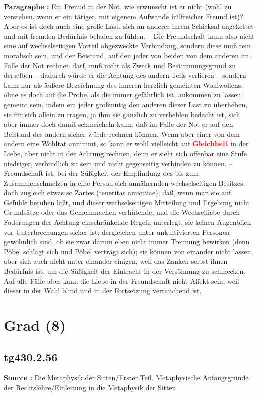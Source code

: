 \documentclass[a4paper,12pt,twoside]{book}
\newcommand{\match}[1]{\textcolor{red}{\textbf{#1}}}
\newcommand{\unnumberedsection}[1]{
	\section*{#1}
	\addcontentsline{toc}{section}{#1}
	\markright{#1}
}
\begin{document}
	\textbf{Paragraphe : }Ein Freund in der Not, wie erwünscht ist er nicht (wohl zu verstehen, wenn er ein tätiger, mit eigenem Aufwande hülfreicher Freund ist)? Aber es ist doch auch eine große Last, sich an anderer ihrem Schicksal angekettet und mit fremden Bedürfnis beladen zu fühlen. – Die Freundschaft kann also nicht eine auf wechselseitigen Vorteil abgezweckte Verbindung, sondern diese muß rein moralisch sein, und der Beistand, auf den jeder von beiden von dem anderen im Falle der Not rechnen darf, muß nicht als Zweck und Bestimmungsgrund zu derselben – dadurch würde er die Achtung des andern Teils verlieren – sondern kann nur als äußere Bezeichnung des inneren herzlich gemeinten Wohlwollens, ohne es doch auf die Probe, als die immer gefährlich ist, ankommen zu lassen, gemeint sein, indem ein jeder großmütig den anderen dieser Last zu überheben, sie für sich allein zu tragen, ja ihm sie gänzlich zu verhehlen bedacht ist, sich aber immer doch damit schmeicheln kann, daß im Falle der Not er auf den Beistand des andern sicher würde rechnen können. Wenn aber einer von dem andern eine Wohltat annimmt, so kann er wohl vielleicht auf \match{Gleichheit} in der Liebe, aber nicht in der Achtung rechnen, denn er sieht sich offenbar eine Stufe niedriger, verbindlich zu sein und nicht gegenseitig verbinden zu können. – Freundschaft ist, bei der Süßigkeit der Empfindung des bis zum Zusammenschmelzen in eine Person sich annähernden wechselseitigen Besitzes, doch zugleich etwas so Zartes (teneritas amicitiae), daß, wenn man sie auf Gefühle beruhen läßt, und dieser wechselseitigen Mitteilung und Ergebung nicht Grundsätze oder das Gemeinmachen verhütende, und die Wechselliebe durch Foderungen der Achtung einschränkende  Regeln unterlegt, sie keinen Augenblick vor Unterbrechungen sicher ist; dergleichen unter unkultivierten Personen gewöhnlich sind, ob sie zwar darum eben nicht immer Trennung bewirken (denn Pöbel schlägt sich und Pöbel verträgt sich); sie können von einander nicht lassen, aber sich auch nicht unter einander einigen, weil das Zanken selbst ihnen Bedürfnis ist, um die Süßigkeit der Eintracht in der Versöhnung zu schmecken. – Auf alle Fälle aber kann die Liebe in der Freundschaft nicht Affekt sein; weil dieser in der Wahl blind und in der Fortsetzung verrauchend ist. 
	
	\unnumberedsection{Grad (8)} 
	\subsection*{tg430.2.56} 
	\textbf{Source : }Die Metaphysik der Sitten/Erster Teil. Metaphysische Anfangsgründe der Rechtslehre/Einleitung in die Metaphysik der Sitten\\  
	
\end{document}
